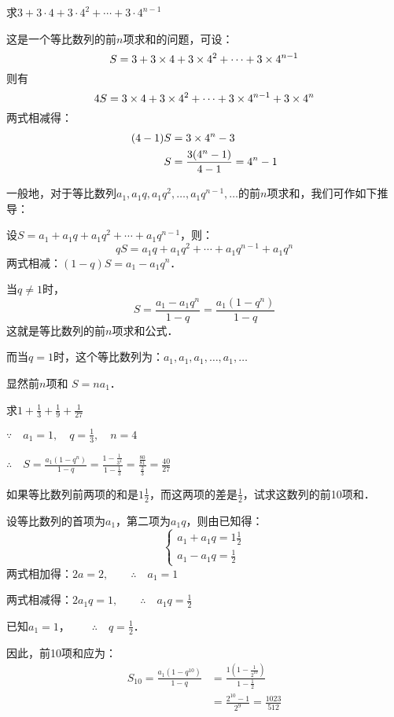 \begin{example}
求$3+3\cdot 4+3\cdot 4^2+\cdots+3\cdot 4^{n-1}$
\end{example}
    
\begin{solution}
这是一个等比数列的前$n$项求和的问题，可设：$$S=3+3\times4+3\times4^2+\cdots+3\times4^{n-1}$$
则有
\[4S=3\times4+3\times4^2+\cdots+3\times4^{n-1}+3\times4^n\]
两式相减得：
\[\begin{split}
    (4-1) S&=3\times4^n-3\\
    S&=\dfrac{3(4^n-1)}{4-1}=4^n-1
\end{split}\]
\end{solution}

一般地，对于等比数列$a_1,a_1q,a_1q^2,\ldots,a_1q^{n-1},\ldots$的前$n$项求和，我们可作如下推导：

设$S=a_1+a_1q+a_1q^2+\cdots+a_1q^{n-1}$，则：
\[qS=a_1q+a_1q^2+\cdots+a_1q^{n-1}+a_1q^n\]
两式相减：$(1-q)S=a_1-a_1q^n$．

当$q\ne 1$时，
\[S=\frac{a_1-a_1q^n}{1-q}=\frac{a_1(1-q^n)}{1-q}\]
这就是等比数列的前$n$项求和公式．

而当$q=1$时，这个等比数列为：$a_1,a_1,a_1,\ldots,a_1,\ldots$

显然前$n$项和 $S=na_1$．

\begin{example}
    求$1+\frac{1}{3}+\frac{1}{9}+\frac{1}{27}$
\end{example}

\begin{solution}
    $\because\quad a_1=1,\quad q=\frac{1}{3},\quad n=4$

    $\therefore\quad S=\frac{a_1(1-q^n)}{1-q}=\frac{1-\frac{1}{3^4}}{1-\frac{1}{3}}=\frac{\frac{80}{81}}{\frac{2}{3}}=\frac{40}{27}$
\end{solution}

\begin{example}
    如果等比数列前两项的和是$1\frac{1}{2}$，而这两项的差是$\frac{1}{2}$，试求这数列的前10项和．    
\end{example}


\begin{solution}
    设等比数列的首项为$a_1$，第二项为$a_1q$，则由已知得：
    \[\begin{cases}
    a_1+a_1q=1\frac{1}{2}\\
    a_1-a_1q=\frac{1}{2}    
    \end{cases}\]
    两式相加得：$2a=2,\qquad \therefore\quad a_1=1$

    两式相减得：$2a_1q=1,\qquad \therefore\quad a_1q=\frac{1}{2}$

    已知$a_1=1$，$\qquad \therefore\quad q=\frac{1}{2}$．

    因此，前10项和应为：
\[\begin{split}
    S_{10}=\frac{a_1(1-q^{10})}{1-q}&=\frac{1\left(1-\frac{1}{2^{10}}\right)}{1-\frac{1}{2}}\\
    &=\frac{2^{10}-1}{2^9}=\frac{1023}{512}
\end{split}\]
\end{solution}


